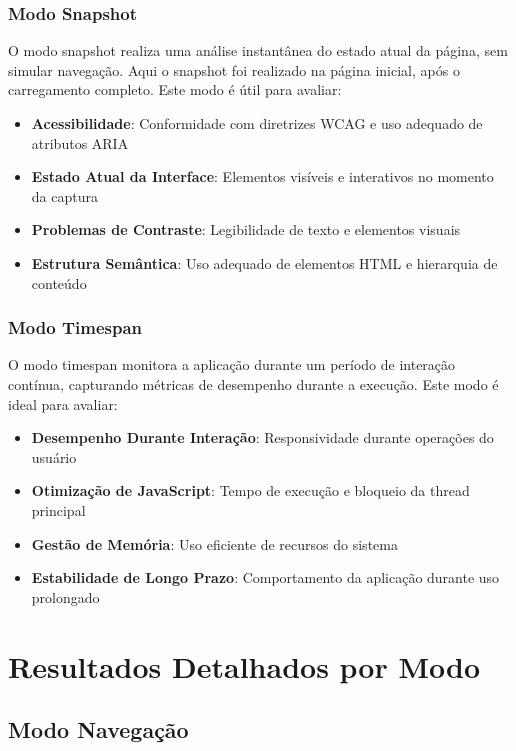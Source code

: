 \subsubsection{Modo Snapshot}

O modo snapshot realiza uma análise instantânea do estado atual da página, sem simular navegação. Aqui o snapshot foi realizado na página inicial, após o carregamento completo. Este modo é útil para avaliar:

\begin{itemize}
    \item \textbf{Acessibilidade}: Conformidade com diretrizes WCAG e uso adequado de atributos ARIA
    \item \textbf{Estado Atual da Interface}: Elementos visíveis e interativos no momento da captura
    \item \textbf{Problemas de Contraste}: Legibilidade de texto e elementos visuais
    \item \textbf{Estrutura Semântica}: Uso adequado de elementos HTML e hierarquia de conteúdo
\end{itemize}

\subsubsection{Modo Timespan}

O modo timespan monitora a aplicação durante um período de interação contínua, capturando métricas de desempenho durante a execução. Este modo é ideal para avaliar:

\begin{itemize}
    \item \textbf{Desempenho Durante Interação}: Responsividade durante operações do usuário
    \item \textbf{Otimização de JavaScript}: Tempo de execução e bloqueio da thread principal
    \item \textbf{Gestão de Memória}: Uso eficiente de recursos do sistema
    \item \textbf{Estabilidade de Longo Prazo}: Comportamento da aplicação durante uso prolongado
\end{itemize}

\section{Resultados Detalhados por Modo}

\subsection{Modo Navegação}

